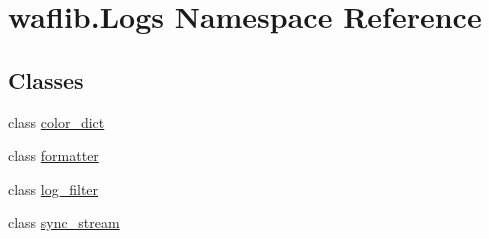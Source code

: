 \hypertarget{namespacewaflib_1_1_logs}{}\section{waflib.\+Logs Namespace Reference}
\label{namespacewaflib_1_1_logs}
\subsection*{Classes}
\begin{DoxyCompactItemize}
\item 
class \hyperlink{classwaflib_1_1_logs_1_1color__dict}{color\+\_\+dict}
\item 
class \hyperlink{classwaflib_1_1_logs_1_1formatter}{formatter}
\item 
class \hyperlink{classwaflib_1_1_logs_1_1log__filter}{log\+\_\+filter}
\item 
class \hyperlink{classwaflib_1_1_logs_1_1sync__stream}{sync\+\_\+stream}
\end{DoxyCompactItemize}
